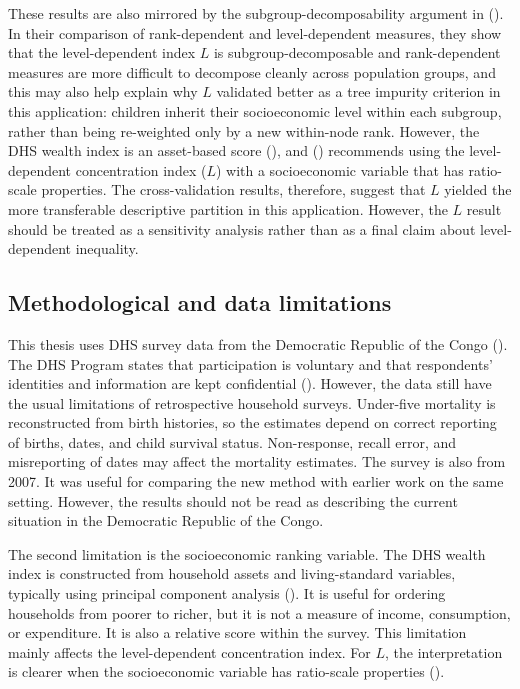 \documentclass[
  11pt,
  a4paper,
]{article}
\begin{document}
These results are also mirrored by the subgroup-decomposability argument
in (). In their comparison of rank-dependent and level-dependent
measures, they show that the level-dependent index \(L\) is
subgroup-decomposable and rank-dependent measures are more difficult to
decompose cleanly across population groups, and this may also help
explain why \(L\) validated better as a tree impurity criterion in this
application: children inherit their socioeconomic level within each
subgroup, rather than being re-weighted only by a new within-node rank.
However, the DHS wealth index is an asset-based score
(), and () recommends using the level-dependent concentration index
(\(L\)) with a socioeconomic variable that has ratio-scale properties.
The cross-validation results, therefore, suggest that \(L\) yielded the
more transferable descriptive partition in this application. However,
the \(L\) result should be treated as a sensitivity analysis rather than
as a final claim about level-dependent inequality.

\subsection{Methodological and data
limitations}\label{methodological-and-data-limitations}

This thesis uses DHS survey data from the Democratic Republic of the
Congo (). The DHS Program states that participation is voluntary and that
respondents' identities and information are kept confidential
().
However, the data still have the usual limitations of retrospective
household surveys. Under-five mortality is reconstructed from birth
histories, so the estimates depend on correct reporting of births,
dates, and child survival status. Non-response, recall error, and
misreporting of dates may affect the mortality estimates. The survey is
also from 2007. It was useful for comparing the new method with earlier
work on the same setting. However, the results should not be read as
describing the current situation in the Democratic Republic of the
Congo.

The second limitation is the socioeconomic ranking variable. The DHS
wealth index is constructed from household assets and living-standard
variables, typically using principal component analysis
(). It is useful for ordering households from poorer to richer, but
it is not a measure of income, consumption, or expenditure. It is also a
relative score within the survey. This limitation mainly affects the
level-dependent concentration index. For \(L\), the interpretation is
clearer when the socioeconomic variable has ratio-scale properties
().
\end{document}
